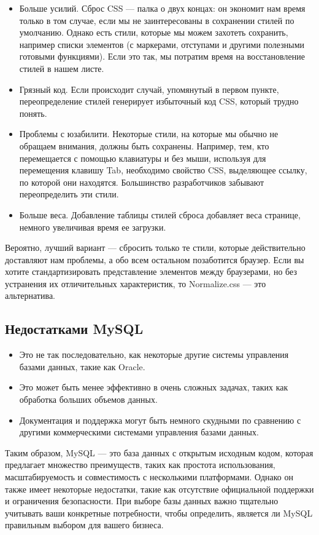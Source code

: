 \begin{itemize}
\item Больше усилий. Сброс CSS — палка о двух концах: он экономит нам время только в том случае, если мы не заинтересованы в сохранении стилей по умолчанию. Однако есть стили, которые мы можем захотеть сохранить, например списки элементов (с маркерами, отступами и другими полезными готовыми функциями). Если это так, мы потратим время на восстановление стилей в нашем листе.

\item Грязный код. Если происходит случай, упомянутый в первом пункте, переопределение стилей генерирует избыточный код CSS, который трудно понять.

\item Проблемы с юзабилити. Некоторые стили, на которые мы обычно не обращаем внимания, должны быть сохранены. Например, тем, кто перемещается с помощью клавиатуры и без мыши, используя для перемещения клавишу Tab, необходимо свойство CSS, выделяющее ссылку, по которой они находятся. Большинство разработчиков забывают переопределить эти стили.

\item Больше веса. Добавление таблицы стилей сброса добавляет веса странице, немного увеличивая время ее загрузки.

\end{itemize}
Вероятно, лучший вариант — сбросить только те стили, которые действительно доставляют нам проблемы, а обо всем остальном позаботится браузер. Если вы хотите стандартизировать представление элементов между браузерами, но без устранения их отличительных характеристик, то Normalize.css — это альтернатива.

\subsection{Недостатками MySQL}
\begin{itemize}
\item Это не так последовательно, как некоторые другие системы управления базами данных, такие как Oracle.
\item Это может быть менее эффективно в очень сложных задачах, таких как обработка больших объемов данных.
\item Документация и поддержка могут быть немного скудными по сравнению с другими коммерческими системами управления базами данных.
\end{itemize}

Таким образом, MySQL — это база данных с открытым исходным кодом, которая предлагает множество преимуществ, таких как простота использования, масштабируемость и совместимость с несколькими платформами. Однако он также имеет некоторые недостатки, такие как отсутствие официальной поддержки и ограничения безопасности. При выборе базы данных важно тщательно учитывать ваши конкретные потребности, чтобы определить, является ли MySQL правильным выбором для вашего бизнеса.

